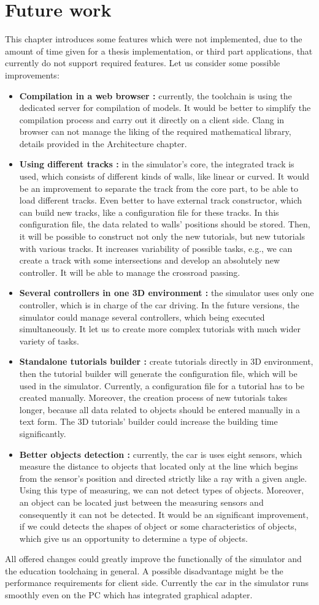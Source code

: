 \chapter{Future work}
This chapter introduces some features which were not implemented, due to the amount of time given for a thesis implementation, or third part applications, that currently do not support required features. Let us consider some possible improvements: \newline
\begin{itemize}
    \item \textbf{Compilation in a web browser :} currently, the toolchain is using the dedicated server for compilation of models. It would be better to simplify the compilation process and carry out it directly on a client side. Clang in browser can not manage the liking of the required mathematical library, details provided in the Architecture chapter.
    \item \textbf{Using different tracks :} in the simulator's core, the integrated track is used, which consists of different kinds of walls, like linear or curved. It would be an improvement to separate the track from the core part, to be able to load different tracks. Even better to have external track constructor, which can build new tracks, like a configuration file for these tracks. In this configuration file, the data related to walls' positions should be stored. Then, it will be possible to construct not only the new tutorials, but new tutorials with various tracks. It increases variability of possible tasks, e.g., we can create a track with some intersections and develop an absolutely new controller. It will be able to manage the crossroad passing.
    \item \textbf{Several controllers in one 3D environment :} the simulator uses only one controller, which is in charge of the car driving. In the future versions, the simulator could manage several controllers, which being executed simultaneously. It let us to create more complex tutorials with much wider variety of tasks.
    \item \textbf{Standalone tutorials builder :} create tutorials directly in 3D environment, then the tutorial builder will generate the configuration file, which will be used in the simulator. Currently, a configuration file for a tutorial has to be created manually. Moreover, the creation process of new tutorials takes longer, because all data related to objects should be entered manually in a text form. The 3D tutorials' builder could increase the building time significantly.
    \item \textbf{Better objects detection :} currently, the car is uses eight sensors, which measure the distance to objects that located only at the line which begins from the sensor's position and directed strictly like a ray with a given angle. Using this type of measuring, we can not detect types of objects. Moreover, an object can be located just between the measuring sensors and consequently it can not be detected. It would be an significant improvement, if we could detects the shapes of object or some characteristics of objects, which give us an opportunity to determine a type of objects.
\end{itemize}
All offered changes could greatly improve the functionally of the simulator and the education toolchaing in general. A possible disadvantage might be the performance requirements for client side. Currently the car in the simulator runs smoothly even on the PC which has integrated graphical adapter.